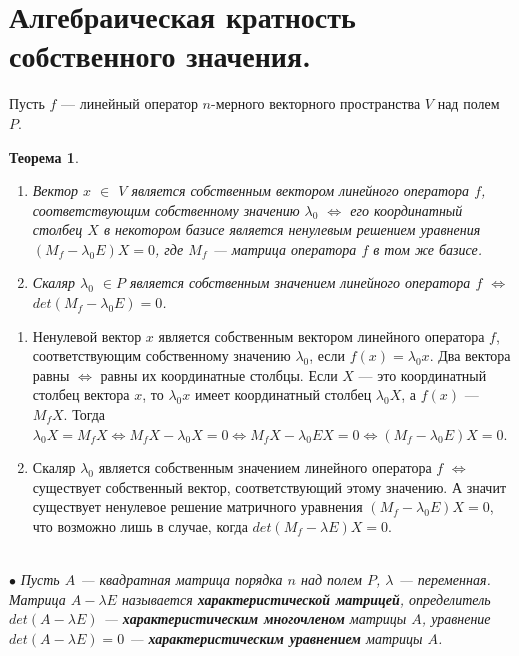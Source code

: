 \section{Алгебраическая кратность собственного значения.}
Пусть $f$ --- линейный оператор $n$-мерного векторного пространства $V$ над полем $P$.
\newtheorem*{th11_8_1}{Теорема}\begin{th11_8_1}\end{th11_8_1}\begin{enumerate}
	\item \textit{Вектор $x$ $\in$ $V$ является собственным вектором линейного оператора $f$, соответствующим собственному значению $\lambda_0$ $\Longleftrightarrow$ его координатный столбец $X$ в некотором базисе является ненулевым решением уравнения $(M_f - \lambda_0 E)X = 0$, где $M_f$ --- матрица оператора $f$ в том же базисе.}
	\item \textit{Скаляр $\lambda_0$ $\in P$ является собственным значением линейного оператора $f$ $\Longleftrightarrow$ $det(M_f - \lambda_0 E) = 0$.}
\end{enumerate}
\begin{Proof}\begin{enumerate}
		\item Ненулевой вектор $x$ является собственным вектором линейного оператора $f$, соответствующим собственному значению $\lambda_0$, если $f(x) = \lambda_0x$. Два вектора равны $\Leftrightarrow$ равны их координатные столбцы. Если $X$ --- это координатный столбец вектора $x$, то $\lambda_0 x$ имеет координатный столбец $\lambda_0 X$, а $f(x)$ --- $M_f X$. Тогда $\lambda_0 X = M_f X \Leftrightarrow M_f X -\lambda_0 X = 0 \Leftrightarrow M_f X -\lambda_0 E X = 0\Leftrightarrow(M_f  -\lambda_0 E) X = 0$.
		\item Скаляр $\lambda_0$ является собственным значением линейного оператора $f$ $\Longleftrightarrow$ существует собственный вектор, соответствующий этому значению. А значит существует ненулевое решение матричного уравнения $(M_f - \lambda_0 E)X = 0$, что возможно лишь в случае, когда $det(M_f - \lambda E)X = 0.$
	\end{enumerate}
\end{Proof}\\
$\bullet$ \textit{Пусть $A$ --- квадратная матрица порядка $n$ над полем $P$, $\lambda$ --- переменная. Матрица $A - \lambda E$ называется \textbf{характеристической матрицей}, определитель $det(A - \lambda E)$ --- \textbf{характеристическим многочленом} матрицы $A$, уравнение $det(A - \lambda E) = 0$ --- \textbf{характеристическим уравнением} матрицы $A$.}\\\\
